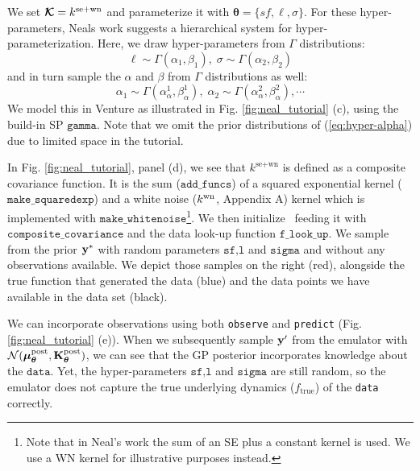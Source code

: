 We set $\bm{\mathcal{K}} = k^{\text{se}+\text{wn}}$ and parameterize it with $\bm{\theta}=\{sf,\ell,\sigma\}$.
For these hyper-parameters, Neals work suggests a hierarchical system for
hyper-parameterization.
Here, we draw hyper-parameters from $\Gamma$ distributions:
\begin{equation}
\label{eq:hyper-ell}
\ell \sim \Gamma(\alpha_1,\beta_1),\;\sigma \sim \Gamma(\alpha_2,\beta_2)
\end{equation} 
and in turn sample the $\alpha$ and $\beta$ from $\Gamma$ distributions as well:
\begin{equation}
\label{eq:hyper-alpha}
\alpha_1 \sim \Gamma(\alpha^1_{\alpha},\beta^1_{ \alpha } ),\; \alpha_2 \sim \Gamma(\alpha^2_{\alpha},\beta^2_{\alpha}),\cdots
\end{equation}
We model this in Venture as illustrated in Fig. \ref{fig:neal_tutorial} (c),
using the build-in \ac{SP} $\texttt{gamma}$. Note that we omit the prior
distributions of (\ref{eq:hyper-alpha}) due to limited space in the tutorial.

In Fig. \ref{fig:neal_tutorial}, panel (d), we see that $k^{\text{se}+\text{wn}}$
is defined as a composite covariance function. It is the sum ($\texttt{add\_funcs}$) of
a squared exponential kernel ($\texttt{make\_squaredexp}$) and a white noise
($k^\text{wn}$, Appendix A)
kernel which is implemented with $\texttt{make\_whitenoise}$\footnote{Note
that in Neal's work \citeyearpar{neal1997monte} the sum of an SE
plus a constant kernel is used. We use a WN kernel for illustrative purposes
instead.}. 
We then initialize \gpmem\ feeding it with $\texttt{composite\_covariance}$ and the data
look-up function $\texttt{f\_look\_up}$. 
We sample from the prior $\mathbf{y}^*$ with random parameters $\texttt{sf,l}$ and $\texttt{sigma}$ and 
without any observations available.
We depict those samples on the right (red), alongside the true function that generated the data (blue) and
the data points we have available in the data set (black).

We can incorporate observations using both \texttt{observe} and \texttt{predict} (Fig. \ref{fig:neal_tutorial} (e)).
When we subsequently sample $\mathbf{y}^\prime$ from the emulator with
$\mathcal{N}(\bm{\mu}_{\bm{\theta}}^\text{post},\mathbf{K}_{\bm{\theta}}^\text{post})$, we can see that the \ac{GP} posterior incorporates knowledge 
about the $\texttt{data}$. Yet, the hyper-parameters $\texttt{sf,l}$ and $\texttt{sigma}$ are still
random, so the emulator does not capture the true underlying dynamics
($f_\text{true}$) of the \texttt{data} correctly. 

